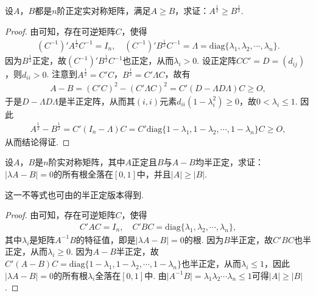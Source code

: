\documentclass[../../main.tex]{subfiles}
\begin{document}
\begin{example}\label{example:例9.79}
设\(A\)，\(B\)都是\(n\)阶正定实对称矩阵，满足\(A\geqslant  B\)，求证：\(A^{\frac{1}{2}}\geqslant  B^{\frac{1}{2}}\).
\end{example}
\begin{proof}
由可知，存在可逆矩阵\(C\)，使得
\begin{align*}
(C^{-1})'A^{\frac{1}{2}}C^{-1} = I_n,\quad (C^{-1})'B^{\frac{1}{2}}C^{-1} = \Lambda = \mathrm{diag}\{\lambda_1,\lambda_2,\cdots,\lambda_n\}.
\end{align*}
因为\(B^{\frac{1}{2}}\)正定，故\((C^{-1})'B^{\frac{1}{2}}C^{-1}\)也正定，从而\(\lambda_i>0\). 设正定阵\(CC' = D=(d_{ij})\)，则\(d_{ii}>0\). 注意到\(A^{\frac{1}{2}} = C'C\)，\(B^{\frac{1}{2}} = C'\Lambda C\)，故有
\begin{align*}
A - B=(C'C)^2-(C'\Lambda C)^2 = C'(D - \Lambda D\Lambda)C\geqslant  O,
\end{align*}
于是\(D - \Lambda D\Lambda\)是半正定阵，从而其\((i,i)\)元素\(d_{ii}(1 - \lambda_i^2)\geqslant 0\)，故\(0<\lambda_i\leqslant 1\). 因此
\begin{align*}
A^{\frac{1}{2}} - B^{\frac{1}{2}} = C'(I_n - \Lambda)C = C'\mathrm{diag}\{1 - \lambda_1,1 - \lambda_2,\cdots,1 - \lambda_n\}C\geqslant  O,
\end{align*}
从而结论得证.

\end{proof}

\begin{example}\label{example:例9.80}
设\(A\)，\(B\)是\(n\)阶实对称矩阵，其中\(A\)正定且\(B\)与\(A - B\)均半正定，求证：\(\vert\lambda A - B\vert = 0\)的所有根全落在\([0,1]\)中，并且\(\vert A\vert\geqslant \vert B\vert\).
\end{example}
\begin{remark}
这一不等式也可由的半正定版本得到.
\end{remark}
\begin{proof}
由可知，存在可逆矩阵\(C\)，使得
\begin{align*}
C'AC = I_n,\quad C'BC = \mathrm{diag}\{\lambda_1,\lambda_2,\cdots,\lambda_n\},
\end{align*}
其中\(\lambda_i\)是矩阵\(A^{-1}B\)的特征值，即是\(\vert\lambda A - B\vert = 0\)的根. 因为\(B\)半正定，故\(C'BC\)也半正定，从而\(\lambda_i\geqslant 0\). 因为\(A - B\)半正定，故\(C'(A - B)C = \mathrm{diag}\{1 - \lambda_1,1 - \lambda_2,\cdots,1 - \lambda_n\}\)也半正定，从而\(\lambda_i\leqslant 1\)，因此\(\vert\lambda A - B\vert = 0\)的所有根\(\lambda_i\)全落在\([0,1]\)中. 由\(\vert A^{-1}B\vert=\lambda_1\lambda_2\cdots\lambda_n\leqslant 1\)可得\(\vert A\vert\geqslant \vert B\vert\). 

\end{proof}
\end{document}
